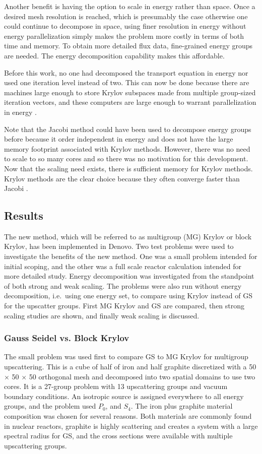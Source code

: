 Another benefit is having the option to scale in energy rather than space. Once a desired mesh resolution is reached, which is presumably the case otherwise one could continue to decompose in space, using finer resolution in energy without energy parallelization simply makes the problem more costly in terms of both time and memory. To obtain more detailed flux data, fine-grained energy groups are needed. The energy decomposition capability makes this affordable. 

Before this work, no one had decomposed the transport equation in energy nor used one iteration level instead of two. This can now be done because there are machines large enough to store Krylov subspaces made from multiple group-sized iteration vectors, and these computers are large enough to warrant parallelization in energy . 

Note that the Jacobi method could have been used to decompose energy groups before because it order independent in energy and does not have the large memory footprint associated with Krylov methods. However, there was no need to scale to so many cores and so there was no motivation for this development. Now that the scaling need exists, there is sufficient memory for Krylov methods. Krylov methods are the clear choice because they often converge faster than Jacobi \cite{LeVeque2007}. 

\subsection{Results}
The new method, which will be referred to as multigroup (MG) Krylov or block Krylov, has been implemented in Denovo. Two test problems were used to investigate the benefits of the new method. One was a small problem intended for initial scoping, and the other was a full scale reactor calculation intended for more detailed study. Energy decomposition was investigated from the standpoint of both strong and weak scaling. The problems were also run without energy decomposition, i.e.\ using one energy set, to compare using Krylov instead of GS for the upscatter groups. First MG Krylov and GS are compared, then strong scaling studies are shown, and finally weak scaling is discussed.

\subsubsection{Gauss Seidel vs. Block Krylov}
The small problem was used first to compare GS to MG Krylov for multigroup upscattering. This is a cube of half of iron and half graphite discretized with a 50 $\times$ 50 $\times$ 50 orthogonal mesh and decomposed into two spatial domains to use two cores. It is a 27-group problem with 13 upscattering groups and vacuum boundary conditions. An isotropic source is assigned everywhere to all energy groups, and the problem used $P_0$, and $S_4$. The iron plus graphite material composition was chosen for several reasons. Both materials are commonly found in nuclear reactors, graphite is highly scattering and creates a system with a large spectral radius for GS, and the cross sections were available with multiple upscattering groups.

